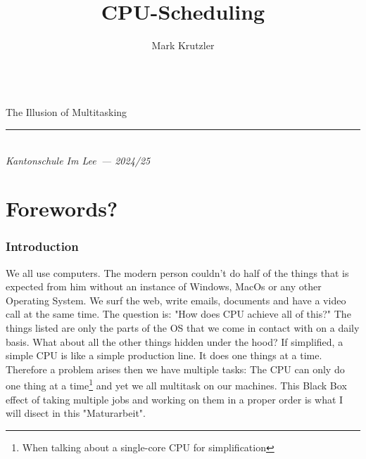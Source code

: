 \documentclass{report}
\title{CPU-Scheduling}
\author{Mark Krutzler}
\newcommand{\thesubtitle}{The Illusion of Multitasking}
\newcommand{\currentdate}{2024/25}
\newcommand{\auinstitution}{Kantonschule Im Lee}
\renewcommand{\maketitle}{
\begin{center}


{\Huge\bfseries
\thetitle}
\vspace{0.5em}\\
{\LARGE\thesubtitle}


{\rule{0.4\textwidth}{.4pt}}

{\bfseries \theauthor}\\
\textit{\auinstitution \ --- \currentdate}
\end{center}
}
\begin{document}
\begin{titlepage}
\vspace*{\fill}
\centering
\maketitle
\vspace*{\fill}
\end{titlepage}

\tableofcontents



\part{Forewords?}

\section{Introduction}


We all use computers.
The modern person couldn't do half of the things that is expected from him without an instance of Windows, MacOs or any other Operating System.
We surf the web, write emails, documents and have a video call at the same time.
The question is: "How does CPU achieve all of this?" The things listed are only the parts of the OS that we come in contact with on a daily basis.
What about all the other things hidden under the hood?
If simplified, a simple CPU is like a simple production line. It does one things at a time.
Therefore a problem arises then we have multiple tasks: The CPU can only do one thing at a time\footnote{When talking about a single-core CPU for simplification} and yet we all multitask on our machines.
This Black Box effect of taking multiple jobs and working on them in a proper order is what I will disect in this "Maturarbeit".
\end{document}
